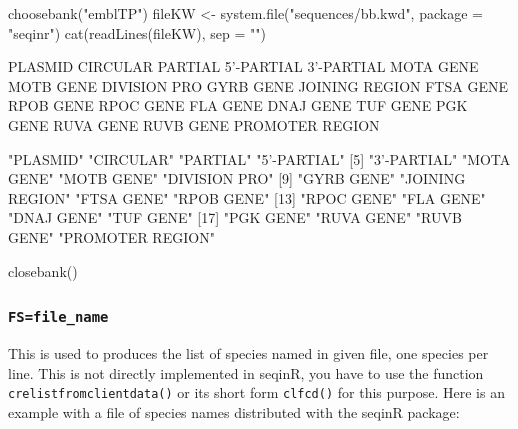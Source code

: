 \documentclass{article}
\begin{document}
\begin{Schunk}
\begin{Sinput}
 choosebank("emblTP")
 fileKW <- system.file("sequences/bb.kwd", package = "seqinr")
 cat(readLines(fileKW), sep = "\n")
\end{Sinput}
\begin{Soutput}
PLASMID
CIRCULAR
PARTIAL
5'-PARTIAL
3'-PARTIAL
MOTA GENE
MOTB GENE
DIVISION PRO
GYRB GENE
JOINING REGION
FTSA GENE
RPOB GENE
RPOC GENE
FLA GENE
DNAJ GENE
TUF GENE
PGK GENE
RUVA GENE
RUVB GENE
PROMOTER REGION
\end{Soutput}
\begin{Soutput}
 [1] "PLASMID"         "CIRCULAR"        "PARTIAL"         "5'-PARTIAL"     
 [5] "3'-PARTIAL"      "MOTA GENE"       "MOTB GENE"       "DIVISION PRO"   
 [9] "GYRB GENE"       "JOINING REGION"  "FTSA GENE"       "RPOB GENE"      
[13] "RPOC GENE"       "FLA GENE"        "DNAJ GENE"       "TUF GENE"       
[17] "PGK GENE"        "RUVA GENE"       "RUVB GENE"       "PROMOTER REGION"
\end{Soutput}
\begin{Sinput}
 closebank()
\end{Sinput}
\end{Schunk}

\subsubsection{\texttt{FS=file\_name}}

This is used to produces the list of species named in given file, one species per line.
This is not directly implemented in seqinR, you have to use the function
\texttt{crelistfromclientdata()} or its short form \texttt{clfcd()} for this purpose. Here is an example with
a file of species names distributed with the seqinR package:
\end{document}
